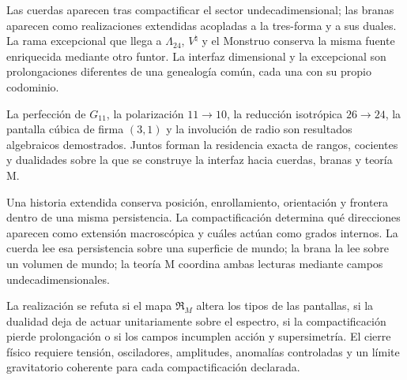 Las cuerdas aparecen tras compactificar el sector undecadimensional; las
branas aparecen como realizaciones extendidas acopladas a la tres-forma y a
sus duales. La rama excepcional que llega a \(\Lambda_{24}\),
\(V^\natural\) y el Monstruo conserva la misma fuente enriquecida mediante
otro funtor. La interfaz dimensional y la excepcional son prolongaciones
diferentes de una genealogía común, cada una con su propio codominio.

\begin{resultado}
La perfección de \(G_{11}\), la polarización \(11\to10\), la reducción
isotrópica \(26\to24\), la pantalla cúbica de firma \((3,1)\) y la
involución de radio son resultados algebraicos demostrados. Juntos forman la
residencia exacta de rangos, cocientes y dualidades sobre la que se construye
la interfaz hacia cuerdas, branas y teoría M.
\end{resultado}

\begin{lecturafisica}
Una historia extendida conserva posición, enrollamiento, orientación y
frontera dentro de una misma persistencia. La compactificación determina qué
direcciones aparecen como extensión macroscópica y cuáles actúan como grados
internos. La cuerda lee esa persistencia sobre una superficie de mundo; la
brana la lee sobre un volumen de mundo; la teoría M coordina ambas lecturas
mediante campos undecadimensionales.
\end{lecturafisica}

\begin{frontera}
La realización se refuta si el mapa \(\mathfrak R_M\) altera los tipos de las
pantallas, si la dualidad deja de actuar unitariamente sobre el espectro, si
la compactificación pierde prolongación o si los campos incumplen acción y
supersimetría. El cierre físico requiere tensión, osciladores, amplitudes,
anomalías controladas y un límite gravitatorio coherente para cada
compactificación declarada.
\end{frontera}
